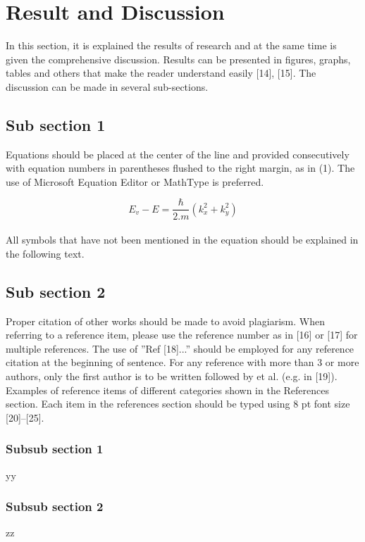 \documentclass{telkomnika}
\begin{document}
\section{Result and Discussion}
\label{}
In this section, it is explained the results of research and at the same time is given 
the comprehensive discussion. Results can be presented in figures, graphs, tables and others that make 
the reader understand easily [14], [15]. The discussion can be made in several sub-sections.


\subsection{Sub section 1}
Equations should be placed at the center of the line and provided consecutively with equation numbers in parentheses flushed to the right margin, as in (1). The use of Microsoft Equation Editor or MathType is preferred.


\begin{equation}
E_v - E = \frac{\hbar}{2.m}(k_x^2 + k_y^2)
\end{equation}
\vspace{.005em}
\\All symbols that have not been mentioned in the equation should be explained in the following text.

\subsection{Sub section 2}
Proper citation of other works should be made to avoid plagiarism. When referring to a reference item, please use the reference number as in [16] or [17] for multiple references. The use of ”Ref [18]...” should be employed for any reference citation at the beginning of sentence. For any reference with more than 3 or more authors, only the first author is to be written followed by et al. (e.g. in [19]). Examples of reference items of different categories shown in the References section. Each item in the references section should be typed using 8 pt font size [20]–[25].

\subsubsection {Subsub section 1}
yy

\subsubsection {Subsub section 2}
zz
\end{document}
